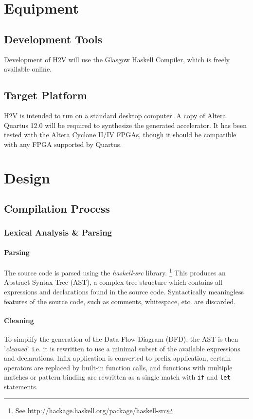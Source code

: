 \documentclass[english,onecolumn]{article}
\begin{document}
\section{Equipment}
\subsection{Development Tools}
Development of H2V will use the Glasgow Haskell Compiler, which is freely available online.

\subsection{Target Platform}
H2V is intended to run on a standard desktop computer. A copy of Altera Quartus 12.0 will be required to synthesize the generated accelerator. It has been tested with the Altera Cyclone II/IV FPGAs, though it should be compatible with any FPGA supported by Quartus.

\section{Design}
\subsection{Compilation Process}
\subsubsection{Lexical Analysis \& Parsing}
\paragraph{Parsing}
The source code is parsed using the \textit{haskell-src} library.%
\footnote{See http://hackage.haskell.org/package/haskell-src}
This produces an Abstract Syntax Tree (AST), a complex tree structure which contains all expressions and declarations found in the source code. Syntactically meaningless features of the source code, such as comments, whitespace, etc. are discarded.

\paragraph{Cleaning}
To simplify the generation of the Data Flow Diagram (DFD), the AST is then '\textit{cleaned}'. i.e. it is rewritten to use a minimal subset of the available expressions and declarations. Infix application is converted to prefix application, certain operators are replaced by built-in function calls, and functions with multiple matches or pattern binding are rewritten as a single match with \lstinline{if} and \lstinline{let} statements.
\end{document}
